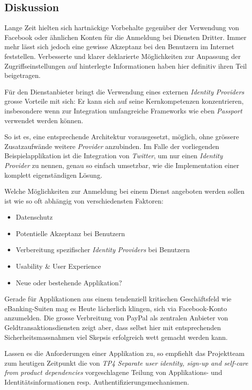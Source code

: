 \subsection*{Diskussion}

Lange Zeit hielten sich hartnäckige Vorbehalte gegenüber der Verwendung von Facebook oder ähnlichen Konten für die Anmeldung bei Diensten Dritter. Immer mehr lässt sich jedoch eine gewisse Akzeptanz bei den Benutzern im Internet feststellen. Verbesserte und klarer deklarierte Möglichkeiten zur Anpassung der Zugriffseinstellungen auf hinterlegte Informationen \cite{facebook-authdialog} haben hier definitiv ihren Teil beigetragen.

Für den Dienstanbieter bringt die Verwendung eines externen \emph{Identity Providers} grosse Vorteile mit sich: Er kann sich auf seine Kernkompetenzen konzentrieren, insbesondere wenn zur Integration umfangreiche Frameworks wie eben \emph{Passport} verwendet werden können.

So ist es, eine entsprechende Architektur vorausgesetzt, möglich, ohne grössere Zusatzaufwände weitere \emph{Provider} anzubinden. Im Falle der vorliegenden Beispielapplikation ist die Integration von \emph{Twitter}, um nur einen \emph{Identity Provider} zu nennen, genau so einfach umsetzbar, wie die Implementation einer komplett eigenständigen Lösung.

Welche Möglichkeiten zur Anmeldung bei einem Dienst angeboten werden sollen ist wie so oft abhängig von verschiedensten Faktoren:

\begin{itemize}
	\item Datenschutz
	\item Potentielle Akzeptanz bei Benutzern
	\item Verbereitung spezifischer \emph{Identity Providers} bei Benutzern
	\item Usability \& User Experience
	\item Neue oder bestehende Applikation?
\end{itemize}

Gerade für Applikationen aus einem tendenziell kritischen Geschäftsfeld wie eBanking-Suiten mag es Heute lächerlich klingen, sich via Facebook-Konto anzumelden. Die grosse Verbreitung von PayPal \cite{paypal} als zentralen Anbieter von Geldtransaktionsdiensten zeigt aber, dass selbst hier mit entsprechenden Sicherheitsmassnahmen viel Skepsis erfolgreich wett gemacht werden kann.

Lassen es die Anforderungen einer Applikation zu, so empfiehlt das Projektteam zum heutigen Zeitpunkt die von \emph{TP4 Separate user identity, sign-up and self-care from product dependencies} vorgeschlagene Teilung von Applikations- und Identitätsinformationen resp. Authentifizierungsmechanismen.
